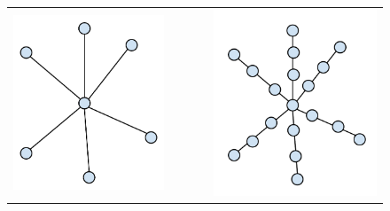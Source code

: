 \documentclass[MS]             %
              {iitmdiss_as}    %
\begin{document}
\begin{figure}[t]
  \centering
  \begin{tabular}[h]{ccccc}
  \includegraphics[scale=0.3]{../img/star.pdf} &&&&
  \includegraphics[scale=0.3]{../img/kstar.pdf}\\

\end{tabular}
\end{figure}
\end{document}
